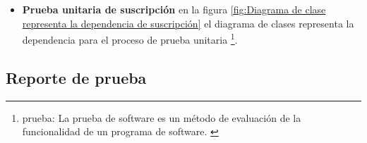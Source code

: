 \begin{itemize}

\item \textbf{Prueba unitaria de suscripción} en la figura 
\ref{fig:Diagrama de clase representa la dependencia de suscripción}
el diagrama de clases representa la dependencia para el proceso de prueba
unitaria \footnote{prueba: La prueba de software es un método de evaluación
de la funcionalidad de un programa de software. \cite{test}}.

\begin{minipage}{1.0\textwidth}
	\centering
	\label{fig:Diagrama de clase representa la dependencia de suscripción}
\end{minipage}

\end{itemize}

\subsection{Reporte de prueba}

